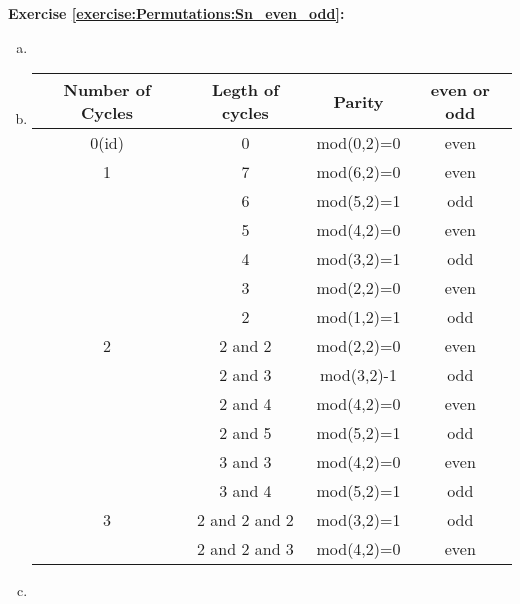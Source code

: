 \noindent\textbf{Exercise  \ref{exercise:Permutations:Sn_even_odd}:}%
\begin{enumerate}[(a)]
\item
\item
\begin{tabular}{|c|c|c|c|}
	\hline
	Number of Cycles & Legth of cycles & Parity & even or odd \\
 	\hline
  	0(id) & 0 & mod(0,2)=0 & even\\
  	\hline
 	1 & 7 & mod(6,2)=0 & even\\
  	& 6 & mod(5,2)=1 & odd\\
  	& 5 & mod(4,2)=0 & even\\
  	& 4 & mod(3,2)=1 & odd\\
  	& 3 & mod(2,2)=0 & even\\
  	& 2 & mod(1,2)=1 & odd\\
  	\hline
  	2 & 2 and 2 & mod(2,2)=0 & even\\
   & 2 and 3 & mod(3,2)-1 & odd\\
   & 2 and 4 & mod(4,2)=0 & even\\
   & 2 and 5 & mod(5,2)=1 & odd\\
   & 3 and 3 & mod(4,2)=0 & even\\
   & 3 and 4 & mod(5,2)=1 & odd\\
   \hline
  	3 & 2 and 2 and 2 & mod(3,2)=1 & odd\\
   & 2 and 2 and 3 & mod(4,2)=0 & even\\
   \hline
\end{tabular}

\item
\end{enumerate}

